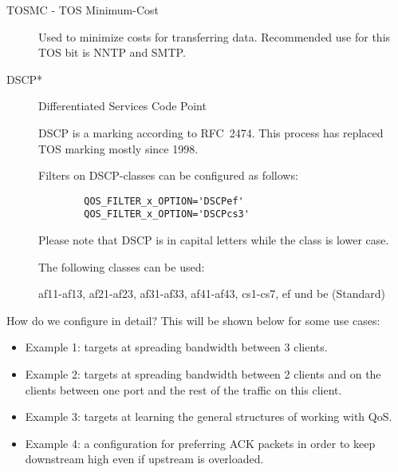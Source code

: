 \begin{description}
\begin{description}
\begin{description}
 \item[TOSMC - TOS Minimum-Cost]

   Used to minimize costs for transferring data.
   Recommended use for this TOS bit is NNTP and SMTP.

 \item[DSCP*] Differentiated Services Code Point

   DSCP is a marking according to RFC\ 2474.
   This process has replaced TOS marking mostly since 1998.

   Filters on DSCP-classes can be configured as follows:

\begin{example}
\begin{verbatim}
        QOS_FILTER_x_OPTION='DSCPef'
        QOS_FILTER_x_OPTION='DSCPcs3'
\end{verbatim}
\end{example}

   Please note that DSCP is in capital letters while the class is lower case.

   The following classes can be used:

   af11-af13, af21-af23, af31-af33, af41-af43, cs1-cs7, ef und be (Standard)

 \end{description}
\end{description}
\end{description}








   How do we configure  in detail? This will be
   shown below for some use cases:
   \begin{itemize}

   \item Example 1: targets at spreading bandwidth between 3 clients.

   \item Example 2: targets at spreading bandwidth between 2
     clients and on the clients between one port and the rest of the traffic
     on this client.

   \item Example 3: targets at learning the general structures of working with QoS.

   \item Example 4: a configuration for preferring ACK packets in order to keep
     downstream high even if upstream is overloaded.

   \end{itemize}



